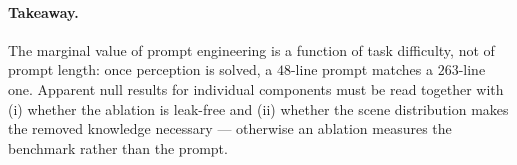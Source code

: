 \paragraph{Takeaway.}
The marginal value of prompt engineering is a function of task difficulty, not of prompt length:
once perception is solved, a $48$-line prompt matches a $263$-line one. Apparent null results for
individual components must be read together with (i) whether the ablation is leak-free and
(ii) whether the scene distribution makes the removed knowledge necessary --- otherwise an
ablation measures the benchmark rather than the prompt.


